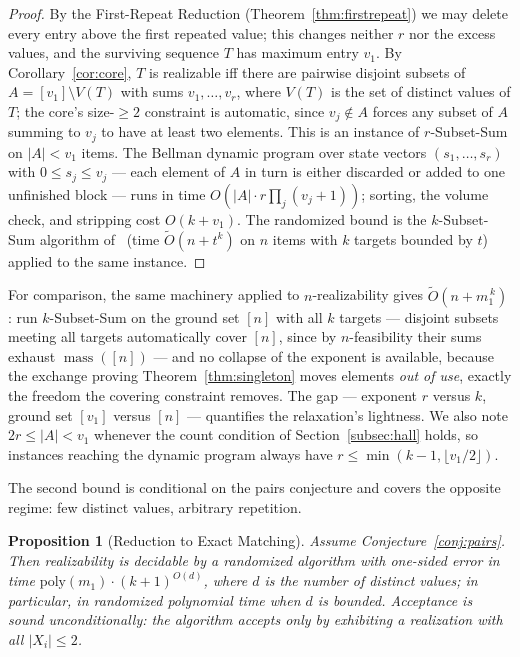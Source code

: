 \documentclass[11pt]{article}
\newtheorem{proposition}[theorem]{Proposition}
\theoremstyle{definition}
\theoremstyle{remark}
\newcommand{\mass}{\operatorname{mass}}
\newcommand{\intv}[1]{[#1]}
\newcommand{\Otilde}{\widetilde{O}}
\begin{document}
\begin{proof}
By the First-Repeat Reduction (Theorem~\ref{thm:firstrepeat}) we may delete every
entry above the first repeated value; this changes neither $r$ nor the excess
values, and the surviving sequence $T$ has maximum entry $v_1$. By
Corollary~\ref{cor:core}, $T$ is realizable iff there are pairwise disjoint
subsets of $A=\intv{v_1}\setminus V(T)$ with sums $v_1,\dots,v_r$, where $V(T)$
is the set of distinct values of $T$; the core's size-$\ge2$ constraint is
automatic, since $v_j\notin A$ forces any subset of $A$ summing to $v_j$ to have
at least two elements. This is an instance of $r$-Subset-Sum on $|A|<v_1$ items.
The Bellman dynamic program over state vectors $(s_1,\dots,s_r)$ with
$0\le s_j\le v_j$ --- each element of $A$ in turn is either discarded or added to
one unfinished block --- runs in time $O(|A|\cdot r\prod_j(v_j+1))$; sorting,
the volume check, and stripping cost $O(k+v_1)$. The randomized bound is the
$k$-Subset-Sum algorithm of~\cite{AntonopoulosPPV23} (time $\Otilde(n+t^k)$ on
$n$ items with $k$ targets bounded by $t$) applied to the same instance.
\end{proof}

For comparison, the same machinery applied to $n$-realizability gives
$\Otilde(n+m_1^{\,k})$: run $k$-Subset-Sum on the ground set $\intv n$ with all
$k$ targets --- disjoint subsets meeting all targets automatically cover $\intv n$,
since by $n$-feasibility their sums exhaust $\mass(\intv n)$ --- and no collapse
of the exponent is available, because the exchange proving
Theorem~\ref{thm:singleton} moves elements \emph{out of use}, exactly the freedom
the covering constraint removes. The gap --- exponent $r$ versus $k$, ground set
$\intv{v_1}$ versus $\intv n$ --- quantifies the relaxation's lightness. We also
note $2r\le|A|<v_1$ whenever the count condition of Section~\ref{subsec:hall}
holds, so instances reaching the dynamic program always have
$r\le\min(k-1,\lfloor v_1/2\rfloor)$.

The second bound is conditional on the pairs conjecture and covers the opposite
regime: few distinct values, arbitrary repetition.

\begin{proposition}[Reduction to Exact Matching]\label{prop:exactmatching}
Assume Conjecture~\ref{conj:pairs}. Then realizability is decidable by a
randomized algorithm with one-sided error in time
$\mathrm{poly}(m_1)\cdot(k+1)^{O(d)}$, where $d$ is the number of distinct
values; in particular, in randomized polynomial time when $d$ is bounded.
Acceptance is sound unconditionally: the algorithm accepts only by exhibiting a
realization with all $|X_i|\le2$.
\end{proposition}
\end{document}
